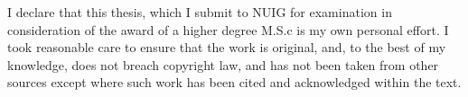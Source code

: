 
I declare that this thesis, which I submit to NUIG for examination in consideration of the award of a higher degree M.S.c is my own personal effort. 
I took reasonable care to ensure that the work is original, and, to the best of my knowledge, does not breach copyright law, and has not been taken from other sources except where such work has been cited and acknowledged within the text.

